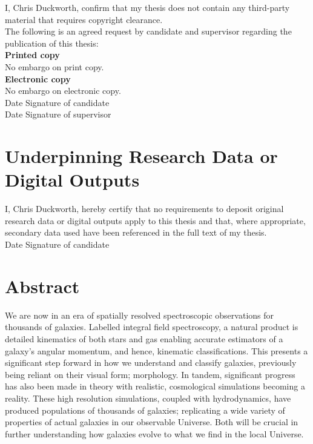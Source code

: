 \documentclass[11pt]{book}
\begin{document}
\noindent I, Chris Duckworth, confirm that my thesis does not contain any third-party material that requires copyright clearance.\\

\noindent The following is an agreed request by candidate and supervisor regarding the publication of this thesis:\\

\noindent \textbf{Printed copy}\\
No embargo on print copy.\\
\textbf{Electronic copy}\\
No embargo on electronic copy.\\

\noindent Date  \hspace{1.8in} Signature of candidate \\

\noindent Date  \hspace{1.8in} Signature of supervisor \\

\chapter{Underpinning Research Data or Digital Outputs}
I, Chris Duckworth, hereby certify that no requirements to deposit original research data or digital outputs apply to this thesis and that, where appropriate, secondary data used have been referenced in the full text of my thesis.\\

\noindent Date \hspace{1.8in} Signature of candidate \\


\chapter{Abstract}
We are now in an era of spatially resolved spectroscopic observations for thousands of galaxies. Labelled integral field spectroscopy, a natural product is detailed kinematics of both stars and gas enabling accurate estimators of a galaxy's angular momentum, and hence, kinematic classifications. This presents a significant step forward in how we understand and classify galaxies, previously being reliant on their visual form; morphology. In tandem, significant progress has also been made in theory with realistic, cosmological simulations becoming a reality. These high resolution simulations, coupled with hydrodynamics, have produced populations of thousands of galaxies; replicating a wide variety of properties of actual galaxies in our observable Universe. Both will be crucial in further understanding how galaxies evolve to what we find in the local Universe. 
\end{document}

